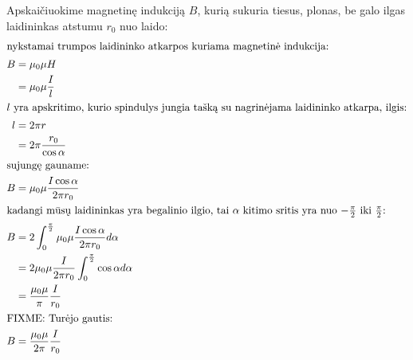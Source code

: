 \begin{exmp}
  Apskaičiuokime magnetinę indukciją $B$, kurią sukuria tiesus, plonas,
  be galo ilgas laidininkas atstumu $r_{0}$ nuo laido:
  \begin{align*}
    \intertext{nykstamai trumpos laidininko atkarpos kuriama magnetinė
    indukcija:}  
    B
    &= \mu_{0} \mu H \\
    &= \mu_{0} \mu \frac{I}{l} \\
    \intertext{$l$ yra apskritimo, kurio spindulys jungia tašką su 
    nagrinėjama laidininko atkarpa, ilgis:}
    l
    &= 2 \pi r \\
    &= 2 \pi \frac{r_{0}}{\cos \alpha} \\
    \intertext{sujungę gauname:}
    B
    &= \mu_{0} \mu \frac{I \cos \alpha}{2 \pi r_{0}} \\
    \intertext{kadangi mūsų laidininkas yra begalinio ilgio, tai
    $\alpha$ kitimo sritis yra nuo $-\frac{\pi}{2}$ iki $\frac{\pi}{2}$:}
    B
    &= 2 \int _{0} ^{\frac{\pi}{2}} \mu_{0} \mu 
      \frac{I \cos \alpha}{2 \pi r_{0}} d \alpha \\
    &= 2 \mu_{0} \mu \frac{I}{2 \pi r_{0}}
      \int _{0} ^{\frac{\pi}{2}} \cos \alpha d\alpha \\
    &= \frac{\mu_{0} \mu}{\pi} \frac{I}{r_{0}}\\
    \intertext{FIXME: Turėjo gautis:}
    B &= \frac{\mu_{0} \mu}{2 \pi} \frac{I}{r_{0}}
  \end{align*}
\end{exmp}

